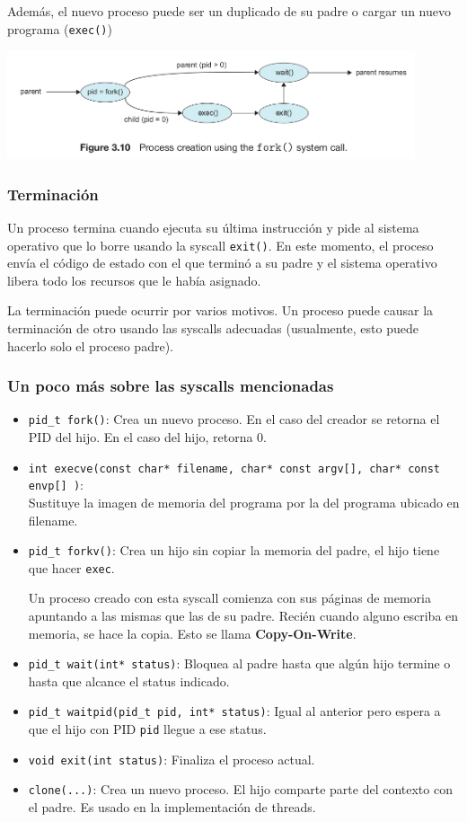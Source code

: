 Además, el nuevo proceso puede ser un duplicado de su padre o cargar un nuevo programa (\texttt{exec()})

\begin{center}
	\includegraphics[width=0.9\textwidth]{imagenes/process_creation.png}
	\end{center}

\subsubsection{Terminación}
Un proceso termina cuando ejecuta su última instrucción y pide al sistema operativo que lo borre usando la syscall \texttt{exit()}. En este momento, el proceso envía el código de estado con el que terminó a su padre y el sistema operativo libera todo los recursos que le había asignado.

La terminación puede ocurrir por varios motivos. Un proceso puede causar la terminación de otro usando las syscalls adecuadas (usualmente, esto puede hacerlo solo el proceso padre).

\subsubsection{Un poco más sobre las syscalls mencionadas}
\begin{itemize}
	\item \texttt{pid\_t fork()}: Crea un nuevo proceso. En el caso del creador se retorna el PID del hijo. En el caso del hijo, retorna 0.
	\item \texttt{int\ execve(const char* filename, char* const argv[], char* const envp[] )}: \\ Sustituye la imagen de memoria del programa por la del programa ubicado en filename.
	\item \texttt{pid\_t forkv()}: Crea un hijo sin copiar la memoria del padre, el hijo tiene que hacer \texttt{exec}.

	Un proceso creado con esta syscall comienza con sus páginas de memoria apuntando a las mismas que las de su padre. Recién cuando alguno escriba en memoria, se hace la copia. Esto se llama \textbf{Copy-On-Write}.

	\item \texttt{pid\_t wait(int* status)}: Bloquea al padre hasta que algún hijo termine o hasta que alcance el status indicado.
	\item \texttt{pid\_t waitpid(pid\_t pid, int* status)}: Igual al anterior pero espera a que el hijo con PID \texttt{pid} llegue a ese status.
	\item \texttt{void exit(int status)}: Finaliza el proceso actual.
	\item \texttt{clone(...)}: Crea un nuevo proceso. El hijo comparte parte del contexto con el padre. Es usado en la implementación de threads.
\end{itemize}

